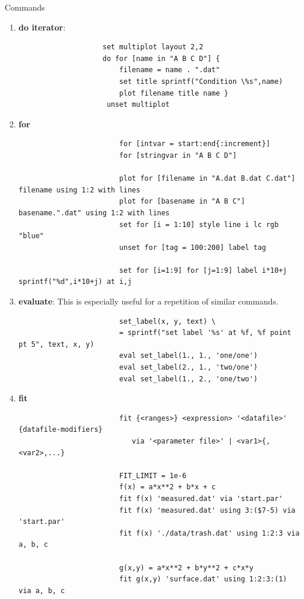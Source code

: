 \documentclass{beamer}
\begin{document}
\begin{frame}{Commands}
\begin{enumerate}
				\item \textbf{do iterator}: \\
					\begin{verbatim}
					set multiplot layout 2,2
					do for [name in "A B C D"] {
					    filename = name . ".dat"
					    set title sprintf("Condition \%s",name)
					    plot filename title name }					
					 unset multiplot
					\end{verbatim}
				
					
				\item 	\textbf{for}
					\begin{verbatim}
						for [intvar = start:end{:increment}]
						for [stringvar in "A B C D"]

						plot for [filename in "A.dat B.dat C.dat"] filename using 1:2 with lines
						plot for [basename in "A B C"] basename.".dat" using 1:2 with lines
						set for [i = 1:10] style line i lc rgb "blue"
						unset for [tag = 100:200] label tag
			           
						set for [i=1:9] for [j=1:9] label i*10+j sprintf("%d",i*10+j) at i,j
					\end{verbatim}		
					

					
				\item \textbf{evaluate}: This is especially useful for a repetition of similar commands.\\
					\begin{verbatim}
						set_label(x, y, text) \
						= sprintf("set label '%s' at %f, %f point pt 5", text, x, y)
						eval set_label(1., 1., 'one/one')
						eval set_label(2., 1., 'two/one')
						eval set_label(1., 2., 'one/two')
					\end{verbatim}
         			\vspace{2cm}
         			        			
         			
				\item 	\textbf{fit}
					\begin{verbatim}
						fit {<ranges>} <expression> '<datafile>' {datafile-modifiers}
			               via '<parameter file>' | <var1>{,<var2>,...}
			               
						FIT_LIMIT = 1e-6
						f(x) = a*x**2 + b*x + c
						fit f(x) 'measured.dat' via 'start.par'
						fit f(x) 'measured.dat' using 3:($7-5) via 'start.par'
						fit f(x) './data/trash.dat' using 1:2:3 via a, b, c

						g(x,y) = a*x**2 + b*y**2 + c*x*y						
						fit g(x,y) 'surface.dat' using 1:2:3:(1) via a, b, c
						

\end{verbatim}
\end{enumerate}
\end{frame}
\end{document}
